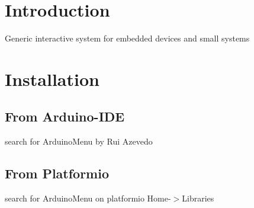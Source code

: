 \hypertarget{index_intro_sec}{}\section{Introduction}\label{index_intro_sec}
Generic interactive system for embedded devices and small systems\hypertarget{index_install_sec}{}\section{Installation}\label{index_install_sec}
\hypertarget{index_arduino_libs}{}\subsection{From Arduino-\/\+I\+DE}\label{index_arduino_libs}
search for Arduino\+Menu by Rui Azevedo\hypertarget{index_platformio_libs}{}\subsection{From Platformio}\label{index_platformio_libs}
search for Arduino\+Menu on platformio Home-\/$>$Libraries 